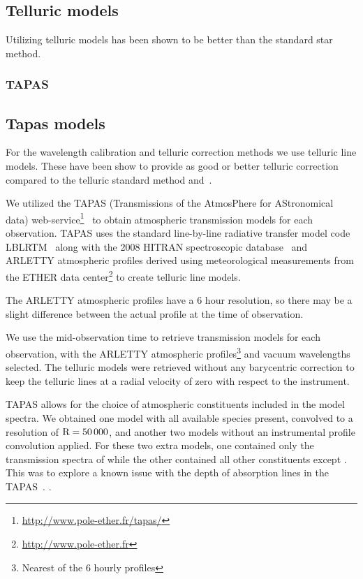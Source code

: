 \subsection{Telluric models}

Utilizing telluric models has been shown to be better than the standard star method.
\subsubsection{TAPAS}

\subsection{Tapas models}
\label{subsec:tapas_models}
For the wavelength calibration and telluric correction methods we use telluric line models. These have been show to provide as good or better telluric correction compared to the telluric standard method and~\citep{ulmer-moll_telluric_2018}.

We utilized the {TAPAS} (Transmissions of the AtmosPhere for AStronomical data) web-service\footnote{\url{http://www.pole-ether.fr/tapas/}}~\citep{bertaux_tapas_2014} to obtain atmospheric transmission models for each observation. {TAPAS} uses the standard line-by-line radiative transfer model code LBLRTM~\citep{clough_linebyline_1995} along with the 2008 {HITRAN} spectroscopic database~\citep{rothman_hitran_2009} and {ARLETTY} atmospheric profiles derived using meteorological measurements from the {ETHER} data center\footnote{\url{http://www.pole-ether.fr}} to create telluric line models.

The {ARLETTY} atmospheric profiles have a 6 hour resolution, so there may be a slight difference between the actual profile at the time of observation.

We use the mid-observation time to retrieve transmission models for each observation, with the {ARLETTY} atmospheric profiles\footnote{Nearest of the 6 hourly profiles} and vacuum wavelengths selected. The telluric models were retrieved without any barycentric correction to keep the telluric lines at a radial velocity of zero with respect to the instrument.

{TAPAS} allows for the choice of atmospheric constituents included in the model spectra. We obtained one model with all available species present, convolved to a resolution of \(\rm R=50\,000\), and another two models without an instrumental profile convolution applied. For these two extra models, one contained only the transmission spectra of while the other contained all other constituents except . This was to explore a known issue with the depth of absorption lines in the TAPAS~\citet{bertaux_tapas_2014}. .


